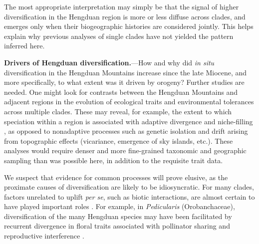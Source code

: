 The most appropriate interpretation may simply be that the signal of higher diversification in the Hengduan region is more or less diffuse across clades, and emerges only when their biogeographic histories are considered jointly. This helps explain why previous analyses of single clades have not yielded the pattern inferred here.

\textbf{Drivers of Hengduan diversification.}---How and why did \textit{in situ} diversification in the Hengduan Mountains increase since the late Miocene, and more specifically, to what extent was it driven by orogeny? Further studies are needed. One might look for contrasts between the Hengduan Mountains and adjacent regions in the evolution of ecological traits and environmental tolerances \citep[e.g.,][]{liu2016} across multiple clades. These may reveal, for example, the extent to which speciation within a region is associated with adaptive divergence and niche-filling \citep{price2014}, as opposed to nonadaptive processes such as genetic isolation and drift arising from topographic effects (vicariance, emergence of sky islands, etc.). These analyses would require denser and more fine-grained taxonomic and geographic sampling than was possible here, in addition to the requisite trait data.


We suspect that evidence for common processes will prove elusive, as the proximate causes of diversification are likely to be idiosyncratic. For many clades, factors unrelated to uplift \emph{per se}, such as biotic interactions, are almost certain to have played important roles \citep{Luebert2014,Wen2014,Renner2016}. For example, in \emph{Pedicularis} (Orobanchaceae), diversification of the many Hengduan species may have been facilitated by recurrent divergence in floral traits associated with pollinator sharing and reproductive interference \citep[e.g.,][]{eaton2012}.

